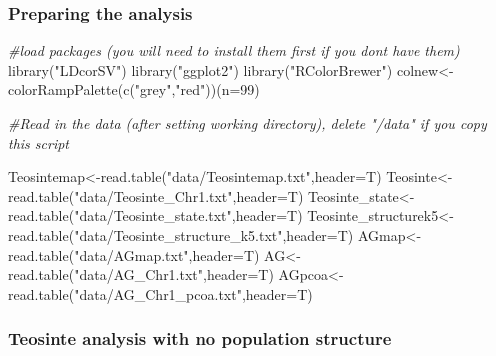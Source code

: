 \documentclass[
]{book}
\newenvironment{Shaded}{\begin{snugshade}}{\end{snugshade}}
\newcommand{\AttributeTok}[1]{\textcolor[rgb]{0.77,0.63,0.00}{#1}}
\newcommand{\CommentTok}[1]{\textcolor[rgb]{0.56,0.35,0.01}{\textit{#1}}}
\newcommand{\DecValTok}[1]{\textcolor[rgb]{0.00,0.00,0.81}{#1}}
\newcommand{\FunctionTok}[1]{\textcolor[rgb]{0.00,0.00,0.00}{#1}}
\newcommand{\NormalTok}[1]{#1}
\newcommand{\OtherTok}[1]{\textcolor[rgb]{0.56,0.35,0.01}{#1}}
\newcommand{\StringTok}[1]{\textcolor[rgb]{0.31,0.60,0.02}{#1}}
\begin{document}
\hypertarget{preparing-the-analysis}{%
\subsubsection{Preparing the analysis}\label{preparing-the-analysis}}

\begin{Shaded}
\begin{Highlighting}[]
\CommentTok{\#load packages (you will need to install them first if you don\textquotesingle{}t have them)}
\FunctionTok{library}\NormalTok{(}\StringTok{"LDcorSV"}\NormalTok{)}
\FunctionTok{library}\NormalTok{(}\StringTok{"ggplot2"}\NormalTok{)}
\FunctionTok{library}\NormalTok{(}\StringTok{"RColorBrewer"}\NormalTok{)}
\NormalTok{colnew}\OtherTok{\textless{}{-}}\FunctionTok{colorRampPalette}\NormalTok{(}\FunctionTok{c}\NormalTok{(}\StringTok{"grey"}\NormalTok{,}\StringTok{"red"}\NormalTok{))(}\AttributeTok{n=}\DecValTok{99}\NormalTok{)}

\CommentTok{\#Read in the data (after setting working directory), delete "/data" if you copy this script}

\NormalTok{Teosintemap}\OtherTok{\textless{}{-}}\FunctionTok{read.table}\NormalTok{(}\StringTok{"data/Teosintemap.txt"}\NormalTok{,}\AttributeTok{header=}\NormalTok{T)}
\NormalTok{Teosinte}\OtherTok{\textless{}{-}}\FunctionTok{read.table}\NormalTok{(}\StringTok{"data/Teosinte\_Chr1.txt"}\NormalTok{,}\AttributeTok{header=}\NormalTok{T)}
\NormalTok{Teosinte\_state}\OtherTok{\textless{}{-}}\FunctionTok{read.table}\NormalTok{(}\StringTok{"data/Teosinte\_state.txt"}\NormalTok{,}\AttributeTok{header=}\NormalTok{T)}
\NormalTok{Teosinte\_structurek5}\OtherTok{\textless{}{-}}\FunctionTok{read.table}\NormalTok{(}\StringTok{"data/Teosinte\_structure\_k5.txt"}\NormalTok{,}\AttributeTok{header=}\NormalTok{T)}
\NormalTok{AGmap}\OtherTok{\textless{}{-}}\FunctionTok{read.table}\NormalTok{(}\StringTok{"data/AGmap.txt"}\NormalTok{,}\AttributeTok{header=}\NormalTok{T)}
\NormalTok{AG}\OtherTok{\textless{}{-}}\FunctionTok{read.table}\NormalTok{(}\StringTok{"data/AG\_Chr1.txt"}\NormalTok{,}\AttributeTok{header=}\NormalTok{T)}
\NormalTok{AGpcoa}\OtherTok{\textless{}{-}}\FunctionTok{read.table}\NormalTok{(}\StringTok{"data/AG\_Chr1\_pcoa.txt"}\NormalTok{,}\AttributeTok{header=}\NormalTok{T)}
\end{Highlighting}
\end{Shaded}

\hypertarget{teosinte-analysis-with-no-population-structure}{%
\subsubsection{Teosinte analysis with no population structure}\label{teosinte-analysis-with-no-population-structure}}
\end{document}

